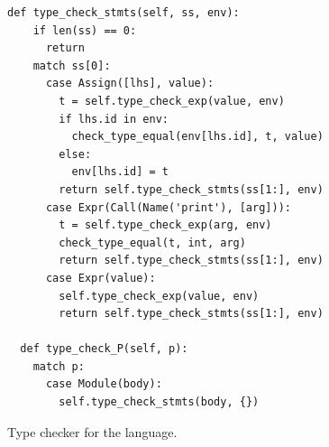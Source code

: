 \documentclass[7x10,nocrop]{TimesAPriori_MIT}%
\begin{document}
\begin{figure}[tbp]
{\begin{lstlisting}[escapechar=`]
  def type_check_stmts(self, ss, env):
    if len(ss) == 0:
      return
    match ss[0]:
      case Assign([lhs], value):
        t = self.type_check_exp(value, env)
        if lhs.id in env:
          check_type_equal(env[lhs.id], t, value)
        else:
          env[lhs.id] = t
        return self.type_check_stmts(ss[1:], env)
      case Expr(Call(Name('print'), [arg])):
        t = self.type_check_exp(arg, env)
        check_type_equal(t, int, arg)
        return self.type_check_stmts(ss[1:], env)
      case Expr(value):
        self.type_check_exp(value, env)
        return self.type_check_stmts(ss[1:], env)

  def type_check_P(self, p):
    match p:
      case Module(body):
        self.type_check_stmts(body, {})
\end{lstlisting}
\fi}
\caption{Type checker for the \LangVar{} language.}
\label{fig:type-check-Lvar}
\end{figure}
\end{document}
